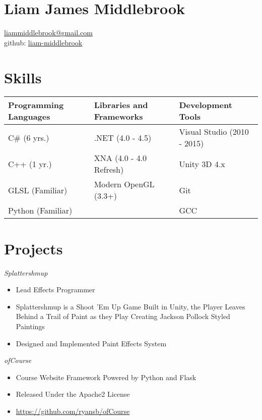 \documentclass[line,margin]{res}
\begin{document}
\marginsize{.5in}{.5in}{1.0in}{.5in}

\section{Liam James Middlebrook}

\href{mailto:liammiddlebrook@gmail.com}{liammiddlebrook@gmail.com}\\
github: \href{https://github.com/liam-middlebrook}{liam-middlebrook}

\begin{resume}


\section{Skills}
\begin{table}[h]
\begin{tabular}{@{}lll@{}}
\toprule
Programming Languages & Libraries and Frameworks & Development Tools           \\ \midrule
C\# (6 yrs.)          & .NET (4.0 - 4.5)         & Visual Studio (2010 - 2015) \\
C++ (1 yr.)           & XNA (4.0 - 4.0 Refresh)  & Unity 3D 4.x                \\
GLSL (Familiar)       & Modern OpenGL (3.3+)     & Git                         \\
Python (Familiar)     &                          & GCC                         \\ \bottomrule
\end{tabular}
\end{table}


\section{Projects}

{\sl Splattershmup}
\begin{itemize}
\itemsep1pt\parskip0pt
\item
Lead Effects Programmer
\item
Splattershmup is a Shoot 'Em Up Game Built in Unity, the Player Leaves Behind a Trail of Paint as they Play
Creating Jackson Pollock Styled Paintings
\item
Designed and Implemented Paint Effects System
\end{itemize}

{\sl ofCourse}
\begin{itemize}
\itemsep1pt\parskip0pt
\item
Course Website Framework Powered by Python and Flask
\item
Released Under the Apache2 License
\item
\url{https://github.com/ryansb/ofCourse}
\end{itemize}


\end{resume}
\end{document}
